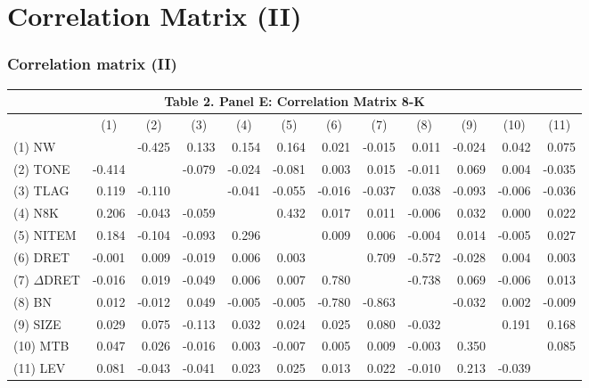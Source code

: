 \documentclass{beamer}
\begin{document}
\section{Correlation Matrix (II)}
\begin{frame}[noframenumbering]
\frametitle{Correlation matrix (II)}
\begin{table}[H] \label{T2PE}
	\begin{center} \tiny
		\begin{tabular}{lrrrrrrrrrrr}
			\multicolumn{12}{c}{\textbf{Table 2. Panel E: Correlation Matrix 8-K}} \\
			\midrule
			\midrule
			& \multicolumn{1}{c}{(1)} & \multicolumn{1}{c}{(2)} & \multicolumn{1}{c}{(3)} & \multicolumn{1}{c}{(4)} & \multicolumn{1}{c}{(5)} & \multicolumn{1}{c}{(6)} & \multicolumn{1}{c}{(7)} & \multicolumn{1}{c}{(8)} & \multicolumn{1}{c}{(9)} & \multicolumn{1}{c}{(10)} & \multicolumn{1}{c}{(11)} \\
			\midrule
			(1) NW & & -0.425 & 0.133 & 0.154 & 0.164 & 0.021 & -0.015 & 0.011 & -0.024 & 0.042 & 0.075 \\
			(2) TONE & -0.414 &   & -0.079 & -0.024 & -0.081 & 0.003 & 0.015 & -0.011 & 0.069 & 0.004 & -0.035 \\
			(3) TLAG & 0.119 & -0.110 &   & -0.041 & -0.055 & -0.016 & -0.037 & 0.038 & -0.093 & -0.006 & -0.036 \\
			(4) N8K & 0.206 & -0.043 & -0.059 &   & 0.432 & 0.017 & 0.011 & -0.006 & 0.032 & 0.000 & 0.022 \\
			(5) NITEM & 0.184 & -0.104 & -0.093 & 0.296 &   & 0.009 & 0.006 & -0.004 & 0.014 & -0.005 & 0.027 \\
			(6) DRET & -0.001 & 0.009 & -0.019 & 0.006 & 0.003 &   & 0.709 & -0.572 & -0.028 & 0.004 & 0.003 \\
			(7) $\Delta$DRET & -0.016 & 0.019 & -0.049 & 0.006 & 0.007 & 0.780 &   & -0.738 & 0.069 & -0.006 & 0.013 \\
			(8) BN & 0.012 & -0.012 & 0.049 & -0.005 & -0.005 & -0.780 & -0.863 &   & -0.032 & 0.002 & -0.009 \\
			(9) SIZE & 0.029 & 0.075 & -0.113 & 0.032 & 0.024 & 0.025 & 0.080 & -0.032 &   & 0.191 & 0.168 \\
			(10) MTB & 0.047 & 0.026 & -0.016 & 0.003 & -0.007 & 0.005 & 0.009 & -0.003 & 0.350 &   & 0.085 \\
			(11) LEV & 0.081 & -0.043 & -0.041 & 0.023 & 0.025 & 0.013 & 0.022 & -0.010 & 0.213 & -0.039 &  \\
			\bottomrule
			\bottomrule
		\end{tabular}%
	\end{center}

\end{table}%


\end{frame}
\end{document}
